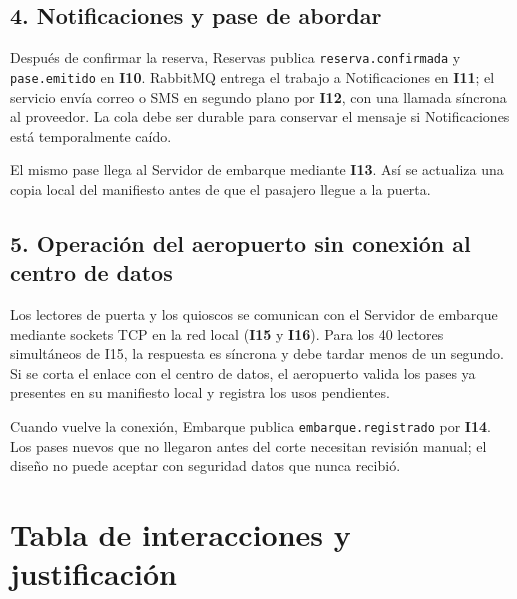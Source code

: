 \documentclass[11pt,a4paper]{article}
\newcommand{\interaccion}[1]{\textbf{I#1}}
\begin{document}
\subsection*{4. Notificaciones y pase de abordar}

Después de confirmar la reserva, Reservas publica \texttt{reserva.confirmada} y \texttt{pase.emitido} en \interaccion{10}. RabbitMQ entrega el trabajo a Notificaciones en \interaccion{11}; el servicio envía correo o SMS en segundo plano por \interaccion{12}, con una llamada síncrona al proveedor. La cola debe ser durable para conservar el mensaje si Notificaciones está temporalmente caído.

El mismo pase llega al Servidor de embarque mediante \interaccion{13}. Así se actualiza una copia local del manifiesto antes de que el pasajero llegue a la puerta.

\subsection*{5. Operación del aeropuerto sin conexión al centro de datos}

Los lectores de puerta y los quioscos se comunican con el Servidor de embarque mediante sockets TCP en la red local (\interaccion{15} y \interaccion{16}). Para los 40 lectores simultáneos de I15, la respuesta es síncrona y debe tardar menos de un segundo. Si se corta el enlace con el centro de datos, el aeropuerto valida los pases ya presentes en su manifiesto local y registra los usos pendientes.

Cuando vuelve la conexión, Embarque publica \texttt{embarque.registrado} por \interaccion{14}. Los pases nuevos que no llegaron antes del corte necesitan revisión manual; el diseño no puede aceptar con seguridad datos que nunca recibió.

\section*{Tabla de interacciones y justificación}
\end{document}
